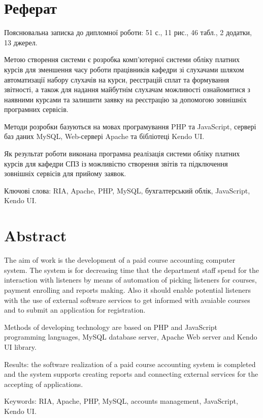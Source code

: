 \newpage
\section*{Реферат}
\bigbreak
Пояснювальна записка до дипломної роботи: 51 с., 11 рис., 46 табл., 2 додатки, 13 джерел.

Метою створення системи є розробка комп'ютерної системи обліку платних курсів для зменшення часу роботи працівників кафедри зі слухачами шляхом автоматизації набору слухачів на курси, реєстрацій сплат та формування звітності, а також для надання майбутнім слухачам можливості ознайомитися з наявними курсами та залишити заявку на реєстрацію за допомогою зовнішніх програмних сервісів.

Методи розробки базуються на мовах програмування PHP та JavaScript, сервері баз даних MySQL, Web-сервері Apache та бібліотеці Kendo UI.

Як результат роботи виконана програмна реалізація системи обліку платних курсів для кафедри СПЗ із можливістю створення звітів та підключення зовнішніх сервісів для прийому заявок.

Ключові слова: RIA, Apache, PHP, MySQL, бухгалтерський облік, JavaScript, Kendo UI.
\newpage
\section*{Abstract}
The aim of work is the development of a paid course accounting computer system. The system is for decreasing time that the department staff spend for the interaction with listeners by means of automation of picking listeners for courses, payment enrolling and reports making. Also it should enable potential listeners with the use of external software services to get informed with avaiable courses and to submit an application for registration.

Methods of developing technology are based on PHP and JavaScript programming languages, MySQL database server, Apache Web server and Kendo UI library.

Results: the software realization of a paid course accounting system is completed and the system supports creating reports and connecting external services for the accepting of applications.

Keywords: RIA, Apache, PHP, MySQL, accounts management, JavaScript, Kendo UI.
